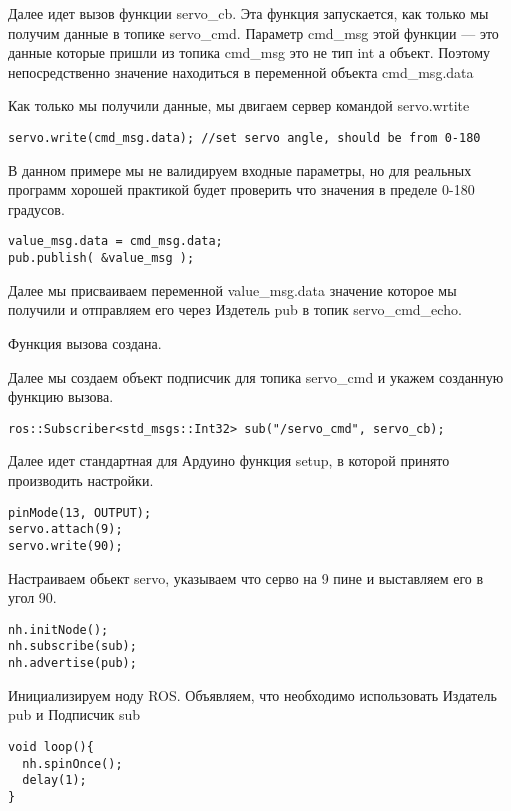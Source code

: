 Далее идет вызов функции servo\_cb. Эта функция запускается, как только мы получим данные в топике servo\_cmd. Параметр cmd\_msg этой функции — это данные которые пришли из топика cmd\_msg это не тип int а объект. Поэтому непосредственно значение находиться в переменной объекта cmd\_msg.data

Как только мы получили данные, мы двигаем сервер командой servo.wrtite

\begin{verbatim}
servo.write(cmd_msg.data); //set servo angle, should be from 0-180
\end{verbatim}

В данном примере мы не валидируем входные параметры, но для реальных программ хорошей практикой будет проверить что значения в пределе 0-180 градусов.

\begin{verbatim}
value_msg.data = cmd_msg.data;
pub.publish( &value_msg );
\end{verbatim}

Далее мы присваиваем переменной value\_msg.data значение которое мы получили и отправляем его через Издетель pub в топик servo\_cmd\_echo.

Функция вызова создана.

Далее мы создаем объект подписчик для топика servo\_cmd и укажем созданную функцию вызова.
\begin{verbatim}
ros::Subscriber<std_msgs::Int32> sub("/servo_cmd", servo_cb);
\end{verbatim}

Далее идет стандартная для Ардуино функция setup, в которой принято производить настройки.
\begin{verbatim}
pinMode(13, OUTPUT);
servo.attach(9);
servo.write(90);
\end{verbatim}

Настраиваем обьект servo, указываем что серво на 9 пине и выставляем его в угол 90.
\begin{verbatim}
nh.initNode();
nh.subscribe(sub);
nh.advertise(pub);
\end{verbatim}

Инициализируем ноду ROS. Объявляем, что необходимо использовать Издатель pub и Подписчик sub
\begin{verbatim}
void loop(){
  nh.spinOnce();
  delay(1);
}
\end{verbatim}

